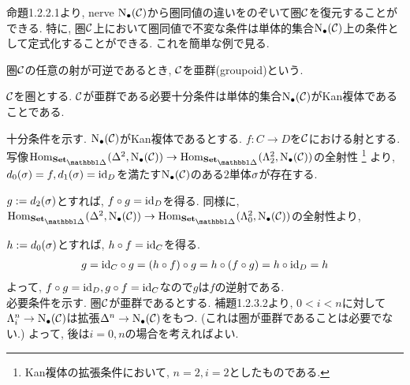 \documentclass[uplatex, a4paper, 14Q, dvipdfmx]{jsreport}
\begin{document}
命題1.2.2.1より, nerve $\mathrm{N}_{\bullet}(\mathcal{C})$から圏同値の違いをのぞいて圏$\mathcal{C}$を復元することができる. 
特に, 圏$\mathcal{C}$上において圏同値で不変な条件は単体的集合$\mathrm{N}_{\bullet}(\mathcal{C})$上の条件として定式化することができる. 
これを簡単な例で見る. 

\begin{definition}
  圏$\mathcal{C}$の任意の射が可逆であるとき, $\mathcal{C}$を亜群(groupoid)という. 
\end{definition}

\begin{prop}
  $\mathcal{C}$を圏とする. 
  $\mathcal{C}$が亜群である必要十分条件は単体的集合$\mathrm{N}_{\bullet}(\mathcal{C})$がKan複体であることである. 
\end{prop}

\begin{Proof}
  十分条件を示す. 
  $\mathrm{N}_{\bullet}(\mathcal{C})$がKan複体であるとする. 
  $f: C \to D$を$\mathcal{C}$における射とする. 
  写像$\Hom_{\sset}(\Delta^2,\N(\calC)) \to \Hom_{\sset}(\Lambda^2_2,\N(\calC))$の全射性
  \footnote{
    Kan複体の拡張条件において, $n=2,i=2$としたものである. 
  }
  より, $d_0(\sigma)=f, d_1(\sigma)=\mathrm{id}_D$を満たす$\mathrm{N}_{\bullet}(\mathcal{C})$のある$2$単体$\sigma$が存在する. 
  \begin{center}
  \end{center}
  $g:=d_2(\sigma)$とすれば, $f \circ g=\mathrm{id}_D$を得る. 
  同様に, $\Hom_{\sset}(\Delta^2,\N(\calC)) \to \Hom_{\sset}(\Lambda^2_0,\N(\calC))$の全射性より, 
  \begin{center}
  \end{center}
  $h:=d_0(\sigma)$とすれば, $h \circ f=\mathrm{id}_C$を得る. 
  \begin{align*}
    g = \mathrm{id}_C \circ g = (h \circ f) \circ g = h \circ (f \circ g) = h \circ \mathrm{id}_D = h
  \end{align*}
  よって, $f \circ g=\mathrm{id}_D, g \circ f=\mathrm{id}_C$なので$g$は$f$の逆射である. \\
  必要条件を示す. 
  圏$\mathcal{C}$が亜群であるとする. 
  補題1.2.3.2より, $0<i<n$に対して$\Lambda^n_i \to \mathrm{N}_{\bullet}(\mathcal{C})$は拡張$\Delta^n \to \mathrm{N}_{\bullet}(\mathcal{C})$をもつ. 
  (これは圏が亜群であることは必要でない.)
  よって, 後は$i=0,n$の場合を考えればよい. 
\end{Proof}
\end{document}
